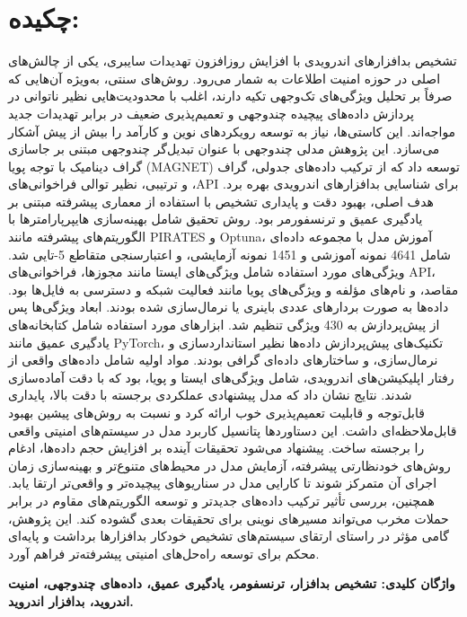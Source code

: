 \chapter*{\vspace{-2.38cm}\fontsize{15}{16}\selectfont چکیده:}
\vspace{-1.5cm}\setlength{\parindent}{20pt}
تشخیص بدافزارهای اندرویدی با افزایش روزافزون تهدیدات سایبری، یکی از چالش‌های اصلی در حوزه امنیت اطلاعات به شمار می‌رود. روش‌های سنتی، به‌ویژه آن‌هایی که صرفاً بر تحلیل ویژگی‌های تک‌وجهی تکیه دارند، اغلب با محدودیت‌هایی نظیر ناتوانی در پردازش داده‌های پیچیده چندوجهی و تعمیم‌پذیری ضعیف در برابر تهدیدات جدید مواجه‌اند. این کاستی‌ها، نیاز به توسعه رویکردهای نوین و کارآمد را بیش از پیش آشکار می‌سازد. این پژوهش مدلی چندوجهی با عنوان تبدیل‌گر چندوجهی مبتنی بر جاسازی گراف دینامیک با توجه پویا (MAGNET) توسعه داد که از ترکیب داده‌های جدولی، گراف و ترتیبی، نظیر توالی فراخوانی‌های ،API برای شناسایی بدافزارهای اندرویدی بهره برد. هدف اصلی، بهبود دقت و پایداری تشخیص با استفاده از معماری پیشرفته مبتنی بر یادگیری عمیق و ترنسفورمر بود. روش تحقیق شامل بهینه‌سازی هایپرپارامترها با الگوریتم‌های پیشرفته مانند PIRATES و Optuna، آموزش مدل با مجموعه داده‌ای شامل 4641 نمونه آموزشی و 1451 نمونه آزمایشی، و اعتبارسنجی متقاطع 5-تایی شد. ویژگی‌های مورد استفاده شامل ویژگی‌های ایستا مانند مجوزها، فراخوانی‌های API، مقاصد، و نام‌های مؤلفه و ویژگی‌های پویا مانند فعالیت شبکه و دسترسی به فایل‌ها بود. داده‌ها به صورت بردارهای عددی باینری یا نرمال‌سازی شده بودند. ابعاد ویژگی‌ها پس از پیش‌پردازش به 430 ویژگی تنظیم شد. ابزارهای مورد استفاده شامل کتابخانه‌های یادگیری عمیق مانند PyTorch، تکنیک‌های پیش‌پردازش داده‌ها نظیر استانداردسازی و نرمال‌سازی، و ساختارهای داده‌ای گرافی بودند. مواد اولیه شامل داده‌های واقعی از رفتار اپلیکیشن‌های اندرویدی، شامل ویژگی‌های ایستا و پویا، بود که با دقت آماده‌سازی شدند. نتایج نشان داد که مدل پیشنهادی عملکردی برجسته با دقت بالا، پایداری قابل‌توجه و قابلیت تعمیم‌پذیری خوب ارائه کرد و نسبت به روش‌های پیشین بهبود قابل‌ملاحظه‌ای داشت. این دستاوردها پتانسیل کاربرد مدل در سیستم‌های امنیتی واقعی را برجسته ساخت. پیشنهاد می‌شود تحقیقات آینده بر افزایش حجم داده‌ها، ادغام روش‌های خودنظارتی پیشرفته، آزمایش مدل در محیط‌های متنوع‌تر و بهینه‌سازی زمان اجرای آن متمرکز شوند تا کارایی مدل در سناریوهای پیچیده‌تر و واقعی‌تر ارتقا یابد. همچنین، بررسی تأثیر ترکیب داده‌های جدیدتر و توسعه الگوریتم‌های مقاوم در برابر حملات مخرب می‌تواند مسیرهای نوینی برای تحقیقات بعدی گشوده کند. این پژوهش، گامی مؤثر در راستای ارتقای سیستم‌های تشخیص خودکار بدافزارها برداشت و پایه‌ای محکم برای توسعه راه‌حل‌های امنیتی پیشرفته‌تر فراهم آورد.

\par\vspace{.5cm}\setlength{\parindent}{0pt}
{\bf
واژگان کلیدی: تشخیص بدافزار، ترنسفومر، یادگیری عمیق، داده‌های چندوجهی، امنیت اندروید، بدافزار اندروید.

} 

 
